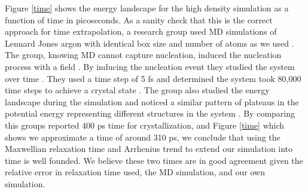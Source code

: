 Figure \ref{time} shows the energy landscape for the high density simulation as a function of time in picoseconds.  As a sanity check that this is the correct approach for time extrapolation, a research group used MD simulations of Lennard Jones argon with identical box size and number of atoms as we used \cite{Park2004}.  The group, knowing MD cannot capture nucleation, induced the nucleation process with a field \cite{Park2004}.  By inducing the nucleation event they studied the system over time \cite{Park2004}.  They used a time step of 5 fs and determined the system took 80,000 time steps to achieve a crystal state \cite{Park2004}.  The group also studied the energy landscape during the simulation and noticed a similar pattern of plateaus in the potential energy representing different structures in the system \cite{Park2004}.  By comparing this groups reported 400 ps time for crystallization, and Figure \ref{time} which shows we approximate a time of around 310 ps, we conclude that using the Maxwellian relaxation time and Arrhenius trend to extend our simulation into time is well founded.  We believe these two times are in good agreement given the relative error in relaxation time used, the MD simulation, and our own simulation.

